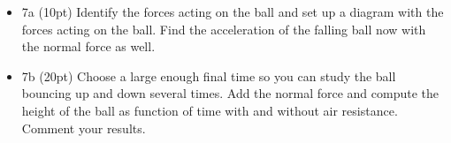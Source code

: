 \documentclass[%
oneside,                 %
final,                   %
10pt]{article}
\begin{document}
\begin{itemize}
\item 7a (10pt) Identify the forces acting on the ball and set up a diagram with the forces acting on the ball. Find the acceleration of the falling ball now with the normal force as well.

\item 7b (20pt) Choose a large enough final time so you can study the ball bouncing up and down several times. Add the normal force and compute the height of the ball as function of time with and without air resistance. Comment your results.
\end{itemize}

\noindent


\end{document}
